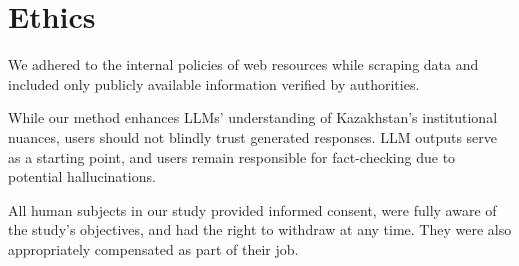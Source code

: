 \begin{compactitem}
\end{compactitem}

\section{Ethics}
We adhered to the internal policies of web resources while scraping data and included only publicly available information verified by authorities.

While our method enhances LLMs' understanding of Kazakhstan's institutional nuances, users should not blindly trust generated responses. LLM outputs serve as a starting point, and users remain responsible for fact-checking due to potential hallucinations.

All human subjects in our study provided informed consent, were fully aware of the study's objectives, and had the right to withdraw at any time. They were also appropriately compensated as part of their job.

